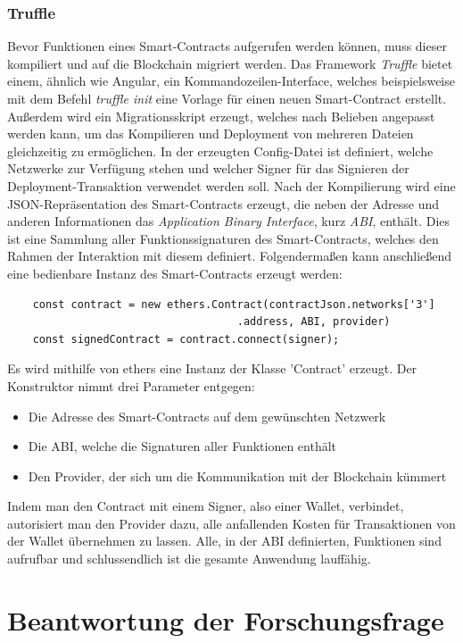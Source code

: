 \subsubsection{Truffle}
Bevor Funktionen eines Smart-Contracts aufgerufen werden können, muss dieser kompiliert und auf die Blockchain migriert werden. Das Framework \emph{Truffle} bietet einem, ähnlich wie Angular, ein Kommandozeilen-Interface, welches beispielsweise mit dem Befehl \emph{truffle init} eine Vorlage für einen neuen Smart-Contract erstellt. Außerdem wird ein Migrationsskript erzeugt, welches nach Belieben angepasst werden kann, um das Kompilieren und Deployment von mehreren Dateien gleichzeitig zu ermöglichen. In der erzeugten Config-Datei ist definiert, welche Netzwerke zur Verfügung stehen und welcher Signer für das Signieren der Deployment-Transaktion verwendet werden soll. Nach der Kompilierung wird eine JSON-Repräsentation des Smart-Contracts erzeugt, die neben der Adresse und anderen Informationen das \emph{Application Binary Interface}, kurz \emph{ABI}, enthält. Dies ist eine Sammlung aller Funktionssignaturen des Smart-Contracts, welches den Rahmen der Interaktion mit diesem definiert.
Folgendermaßen kann anschließend eine bedienbare Instanz des Smart-Contracts erzeugt werden: 
\begin{lstlisting}
	const contract = new ethers.Contract(contractJson.networks['3']
									.address, ABI, provider)
	const signedContract = contract.connect(signer);
\end{lstlisting}
Es wird mithilfe von ethers eine Instanz der Klasse 'Contract' erzeugt. Der Konstruktor nimmt drei Parameter entgegen:
\begin{itemize}
	\item Die Adresse des Smart-Contracts auf dem gewünschten Netzwerk
	\item Die ABI, welche die Signaturen aller Funktionen enthält
	\item Den Provider, der sich um die Kommunikation mit der Blockchain kümmert
\end{itemize}
Indem man den Contract mit einem Signer, also einer Wallet, verbindet, autorisiert man den Provider dazu, alle anfallenden Kosten für Transaktionen von der Wallet übernehmen zu lassen. Alle, in der ABI definierten, Funktionen sind aufrufbar und schlussendlich ist die gesamte Anwendung lauffähig.
\section{Beantwortung der Forschungsfrage}
